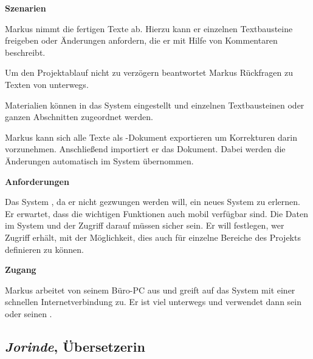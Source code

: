 \begin{multicols}{2}
\textbf{Szenarien}

Markus nimmt die fertigen Texte ab. Hierzu kann er einzelnen Textbausteine freigeben oder Änderungen anfordern, die er mit Hilfe von Kommentaren beschreibt. 

Um den Projektablauf nicht zu verzögern beantwortet Markus Rückfragen zu Texten von unterwegs.

Materialien können in das System eingestellt und einzelnen Textbausteinen oder ganzen Abschnitten zugeordnet werden.

Markus kann sich alle Texte als -Dokument exportieren um Korrekturen darin vorzunehmen. Anschließend importiert er das Dokument. Dabei werden die Änderungen automatisch im System übernommen.

\textbf{Anforderungen}

Das System , da er nicht gezwungen werden will, ein neues System zu erlernen. Er erwartet, dass die wichtigen Funktionen auch mobil verfügbar sind. Die Daten im System und der Zugriff darauf müssen sicher sein. Er will festlegen, wer Zugriff erhält, mit der Möglichkeit, dies auch für einzelne Bereiche des Projekts definieren zu können.

\textbf{Zugang}

Markus arbeitet von seinem Büro-PC aus und greift auf das System mit einer schnellen Internetverbindung zu. Er ist viel unterwegs und verwendet dann sein  oder seinen .

\end{multicols}

\pagebreak

\subsection{\emph{Jorinde}, Übersetzerin}\label{p:jorinde}

